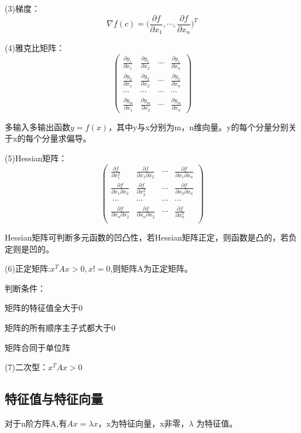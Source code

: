 \documentclass[UTF8]{ctexart} %
\begin{document}
		(3)梯度：
		\[\nabla f(c)=\big(\frac{\partial f}{\partial x_1},\cdots,\frac{\partial f}{\partial x_n}\big)^T\]
		
		(4)雅克比矩阵：		
		\[\begin{pmatrix}
		\frac{\partial y_1}{\partial x_1} & \frac{\partial y_1}{\partial x_2} &\cdots & \frac{\partial y_1}{\partial x_n}\\
		\frac{\partial y_2}{\partial x_1} & \frac{\partial y_2}{\partial x_2} &\cdots & \frac{\partial y_2}{\partial x_n}\\
		\cdots & \cdots & \cdots & \cdots\\
		\frac{\partial y_m}{\partial x_1} & \frac{\partial y_m}{\partial x_2} &\cdots & \frac{\partial y_m}{\partial x_n}
		\end{pmatrix}\]
		
		多输入多输出函数$y=f(x)$，其中y与x分别为m，n维向量。y的每个分量分别关于x的每个分量求偏导。
		
		(5)Hessian矩阵：
		\[\begin{pmatrix}
		\frac{\partial f}{\partial x_1^2} & \frac{\partial f}{\partial x_1\partial x_2} &\cdots & \frac{\partial f}{\partial x_1\partial x_n}\\
		\frac{\partial f}{\partial x_1\partial x_2} & \frac{\partial f}{\partial x_2^2} &\cdots & \frac{\partial f}{\partial x_2\partial x_n}\\\
		\cdots & \cdots & \cdots & \cdots\\
		\frac{\partial f}{\partial x_n\partial x_2} & \frac{\partial f}{\partial x_n\partial x_2} &\cdots & \frac{\partial f}{\partial x_n^2}\\
		\end{pmatrix}\]
		
		Hessian矩阵可判断多元函数的凹凸性，若Hessian矩阵正定，则函数是凸的，若负定则是凹的。
		
		(6)正定矩阵:$x^TAx>0,x!=0$,则矩阵A为正定矩阵。
		
		\qquad 判断条件：
		
		\qquad \qquad 矩阵的特征值全大于0
		
		\qquad \qquad 矩阵的所有顺序主子式都大于0
		
		\qquad \qquad 矩阵合同于单位阵
		
		(7)二次型：$x^TAx>0$
		
		\subsection{特征值与特征向量}
		对于n阶方阵A,有$Ax=\lambda x$，x为特征向量，x非零，$\lambda$ 为特征值。
		
\end{document}
